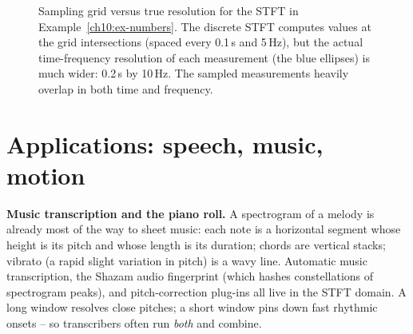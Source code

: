 \begin{figure}[H]
\centering
{}
\caption{Sampling grid versus true resolution for the STFT in Example~\ref{ch10:ex-numbers}.
The discrete STFT computes values at the grid intersections (spaced every 0.1\,s and 5\,Hz),
but the actual time-frequency resolution of each measurement (the blue ellipses) is much wider:
0.2\,s by 10\,Hz. The sampled measurements heavily overlap in both time and frequency.}
\label{ch10:fig-worked-grid}
\end{figure}

\section{Applications: speech, music, motion}
\label{ch10:applications}

\begin{applicationbox}
\textbf{Music transcription and the piano roll.} A spectrogram of a melody is
already most of the way to sheet music: each note is a horizontal segment whose
height is its pitch and whose length is its duration; chords are vertical stacks;
vibrato (a rapid slight variation in pitch) is a wavy line. Automatic music transcription, the Shazam audio
fingerprint (which hashes constellations of spectrogram peaks), and
pitch-correction plug-ins all live in the STFT domain. A long window resolves
close pitches; a short window pins down fast rhythmic onsets -- so transcribers
often run \emph{both} and combine.
\end{applicationbox}


